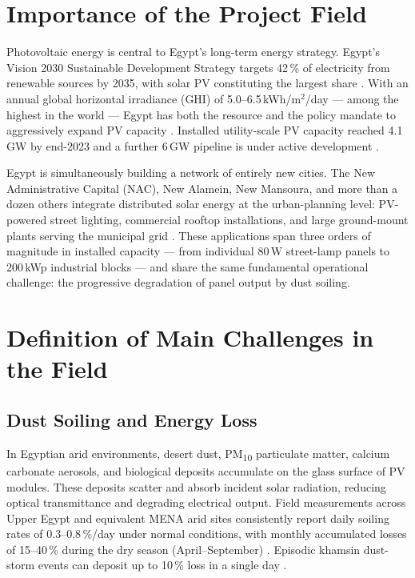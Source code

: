 \documentclass[12pt,a4paper]{report}
\numberwithin{equation}{chapter}
\numberwithin{figure}{chapter}
\numberwithin{table}{chapter}
\begin{document}
\section{Importance of the Project Field}

Photovoltaic energy is central to Egypt's long-term energy strategy. Egypt's Vision 2030
Sustainable Development Strategy targets 42\,\% of electricity from renewable sources by
2035, with solar PV constituting the largest share \cite{egypt2030vision}. With an annual
global horizontal irradiance (GHI) of 5.0--6.5\,kWh/m$^2$/day --- among the highest in
the world --- Egypt has both the resource and the policy mandate to aggressively expand PV
capacity \cite{globalsolaratlas,irena2023egypt}. Installed utility-scale PV capacity
reached 4.1\,GW by end-2023 and a further 6\,GW pipeline is under active development
\cite{irena2023egypt}.

Egypt is simultaneously building a network of entirely new cities. The New Administrative
Capital (NAC), New Alamein, New Mansoura, and more than a dozen others integrate distributed
solar energy at the urban-planning level: PV-powered street lighting, commercial rooftop
installations, and large ground-mount plants serving the municipal grid
\cite{egypt2030vision}. These applications span three orders of magnitude in installed
capacity --- from individual 80\,W street-lamp panels to 200\,kWp industrial blocks ---
and share the same fundamental operational challenge: the progressive degradation of panel
output by dust soiling.

\section{Definition of Main Challenges in the Field}

\subsection{Dust Soiling and Energy Loss}

In Egyptian arid environments, desert dust, PM\textsubscript{10} particulate matter,
calcium carbonate aerosols, and biological deposits accumulate on the glass surface of PV
modules. These deposits scatter and absorb incident solar radiation, reducing optical
transmittance and degrading electrical output. Field measurements across Upper Egypt
and equivalent MENA arid sites consistently report daily soiling rates of
0.3--0.8\,\%/day under normal conditions, with monthly accumulated losses of 15--40\,\%
during the dry season (April--September) \cite{kazem2023soiling,sarver2013pvsoiling}.
Episodic khamsin dust-storm events can deposit up to 10\,\% loss in a single day
\cite{caron2013soilingbenban}.
\end{document}
